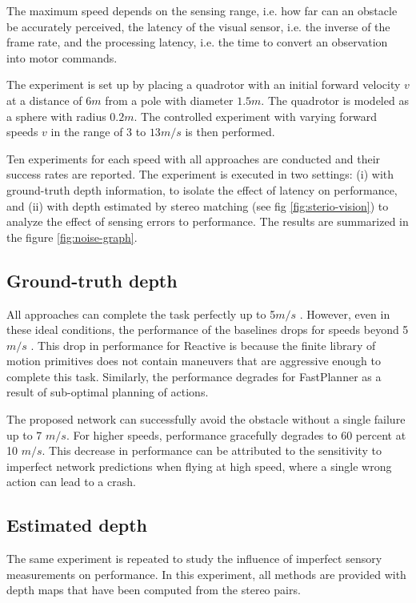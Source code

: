 The maximum speed depends on the sensing range, i.e. how far can an obstacle be accurately perceived, the latency of the visual sensor, i.e. the inverse of the frame rate, and the processing latency, i.e. the time to convert an observation into motor commands. 

The experiment is set up by placing a quadrotor with an initial forward velocity $v$ at a distance of $6 m$ from a pole with diameter $1.5 m$. The quadrotor is modeled as a sphere with radius $0.2 m$. The controlled experiment with varying forward speeds $v$ in the range of 3 to $13 m/s$ is then performed.

Ten experiments for each speed with all approaches are conducted and their success rates are reported. The experiment is executed in two settings: (i) with ground-truth depth information, to isolate the effect of latency on performance, and (ii) with depth estimated by stereo matching \cite{stereoMatching} (see fig \ref{fig:sterio-vision}) to analyze the effect of sensing errors to performance. The results are summarized in the figure \ref{fig:noise-graph}.

\subsection{Ground-truth depth}
All approaches can complete the task perfectly up to 5$m/s$ . However, even in these ideal conditions, the performance of the baselines drops for speeds beyond 5$m/s$ . This drop in performance for Reactive \cite{reactive_method} is because the finite library of motion primitives does not contain maneuvers that are aggressive enough to complete this task. Similarly, the performance degrades for FastPlanner \cite{fastPlanner} as a result of sub-optimal planning of actions. 

The proposed network can successfully avoid the obstacle without a single failure up to 7 $m/s$. For higher speeds, performance gracefully degrades to 60 percent at 10 $m/s$. This decrease in performance can be attributed to the sensitivity to imperfect network predictions when flying at high speed, where a single wrong action can lead to a crash. 

\subsection{Estimated depth}
The same experiment is repeated to study the influence of imperfect sensory measurements on performance. In this experiment, all methods are provided with depth maps that have been computed from the stereo pairs.   

